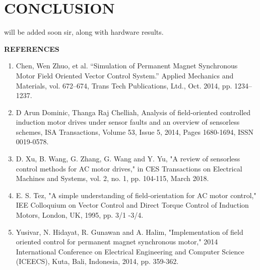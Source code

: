 \section{CONCLUSION}

will be added soon sir, along with hardware results.

\newpage


{\centering \textbf{REFERENCES}}


\begin{enumerate}
\item Chen, Wen Zhuo, et al. “Simulation of Permanent Magnet Synchronous Motor Field Oriented Vector Control System.” Applied Mechanics and Materials, vol. 672–674, Trans Tech Publications, Ltd., Oct. 2014, pp. 1234–1237.


\vspace{5mm} %

\item D Arun Dominic, Thanga Raj Chelliah,
Analysis of field-oriented controlled induction motor drives under sensor faults and an overview of sensorless schemes,
ISA Transactions,
Volume 53, Issue 5,
2014,
Pages 1680-1694,
ISSN 0019-0578.

\vspace{5mm} %

\item D. Xu, B. Wang, G. Zhang, G. Wang and Y. Yu, "A review of sensorless control methods for AC motor drives," in CES Transactions on Electrical Machines and Systems, vol. 2, no. 1, pp. 104-115, March 2018.


\vspace{5mm} %

\item  E. S. Tez, "A simple understanding of field-orientation for AC motor control," IEE Colloquium on Vector Control and Direct Torque Control of Induction Motors, London, UK, 1995, pp. 3/1 -3/4.

\vspace{5mm} %


\item  Yusivar, N. Hidayat, R. Gunawan and A. Halim, "Implementation of field oriented control for permanent magnet synchronous motor," 2014 International Conference on Electrical Engineering and Computer Science (ICEECS), Kuta, Bali, Indonesia, 2014, pp. 359-362.

\end{enumerate}
